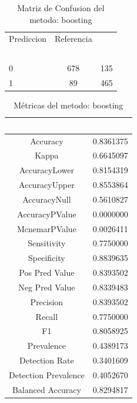 \documentclass[]{article}
\begin{document}
\begin{table}[!h]

\caption{\label{tab:MatrizConf_boosting}Matriz de Confusion del metodo: boosting }
\centering
\begin{tabular}[t]{lcc}
\toprule
\multicolumn{1}{c}{Prediccion} & \multicolumn{1}{c}{Referencia} & \multicolumn{1}{c}{ } \\
\cmidrule(l{3pt}r{3pt}){1-1} \cmidrule(l{3pt}r{3pt}){2-2}
\rowcolor{black}  \multicolumn{1}{c}{\textcolor{white}{\textbf{ }}} & \multicolumn{1}{c}{\textcolor{white}{\textbf{0}}} & \multicolumn{1}{c}{\textcolor{white}{\textbf{1}}}\\
\midrule
\rowcolor{gray!6}  0 & 678 & 135\\
1 & 89 & 465\\
\bottomrule
\end{tabular}
\end{table}

\begin{table}[!h]

\caption{\label{tab:metricas_boosting}Métricas del metodo: boosting }
\centering
\begin{tabular}[t]{cc}
\toprule
\rowcolor{black}  \multicolumn{1}{c}{\textcolor{white}{\textbf{metricas}}} & \multicolumn{1}{c}{\textcolor{white}{\textbf{valor}}}\\
\midrule
\rowcolor{gray!6}  Accuracy & 0.8361375\\
Kappa & 0.6645097\\
\rowcolor{gray!6}  AccuracyLower & 0.8154319\\
AccuracyUpper & 0.8553864\\
\rowcolor{gray!6}  AccuracyNull & 0.5610827\\
\addlinespace
AccuracyPValue & 0.0000000\\
\rowcolor{gray!6}  McnemarPValue & 0.0026411\\
Sensitivity & 0.7750000\\
\rowcolor{gray!6}  Specificity & 0.8839635\\
Pos Pred Value & 0.8393502\\
\addlinespace
\rowcolor{gray!6}  Neg Pred Value & 0.8339483\\
Precision & 0.8393502\\
\rowcolor{gray!6}  Recall & 0.7750000\\
F1 & 0.8058925\\
\rowcolor{gray!6}  Prevalence & 0.4389173\\
\addlinespace
Detection Rate & 0.3401609\\
\rowcolor{gray!6}  Detection Prevalence & 0.4052670\\
Balanced Accuracy & 0.8294817\\
\bottomrule
\end{tabular}
\end{table}
\end{document}
